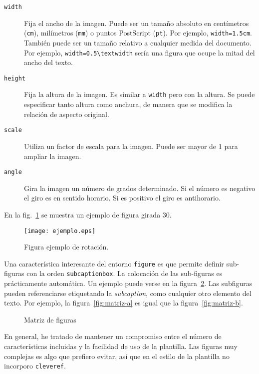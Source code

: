 \begin{description}
\item[\texttt{width}]  Fija el ancho de la imagen.  Puede ser un tamaño absoluto en centímetros (\texttt{cm}), milímetros (\texttt{mm}) o puntos PostScript (\texttt{pt}).  Por ejemplo,  \verb|width=1.5cm|.  También puede ser un tamaño relativo a cualquier medida del documento.  Por ejemplo, \verb|width=0.5\textwidth| sería una figura que ocupe la mitad del ancho del texto.

\item[\texttt{height}] Fija la altura de la imagen.  Es similar a \texttt{width} pero con la altura.  Se puede especificar tanto altura como anchura, de manera que se modifica la relación de aspecto original.

\item[\texttt{scale}] Utiliza un factor de escala para la imagen.  Puede ser mayor de 1 para ampliar la imagen.

\item[\texttt{angle}] Gira la imagen un número de grados determinado.  Si el número es negativo el giro es en sentido horario.  Si es positivo el giro es antihorario.
\end{description}


En la fig.~\ref{fig:figura-angulo-30} se muestra un ejemplo de figura girada 30.

\begin{figure}[btp]
\centering
\texttt{[image: ejemplo.eps]}
\caption{Figura ejemplo de rotación.}
\label{fig:figura-angulo-30}
\end{figure}


Una característica interesante del entorno \texttt{figure} es que permite definir sub-figuras con la orden \texttt{subcaptionbox}.  La colocación de las sub-figuras es prácticamente automática.  Un ejemplo puede verse en la figura~\ref{fig:matriz-figuras}. Las subfiguras pueden referenciarse etiquetando la \emph{subcaption}, como cualquier otro elemento del texto.  Por ejemplo, la figura~\ref{fig:matriz-a} es igual que la figura~\ref{fig:matriz-b}.

\begin{figure}[htbp]
\centering
{}
\caption{Matriz de figuras} 
\label{fig:matriz-figuras}
\end{figure}

En general, he tratado de mantener un compromiso entre el número de características incluidas y la facilidad de uso de la plantilla.  Las figuras muy complejas es algo que prefiero evitar, así que en el estilo de la plantilla no incorporo \texttt{cleveref}.

